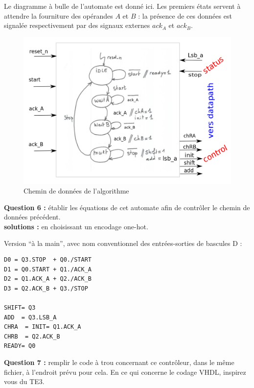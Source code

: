 \documentclass[a4paper,11pt]{article}
\begin{document}
Le diagramme à bulle de l'automate est donné ici. Les premiers états servent à attendre la fourniture des opérandes $A$ et $B$ : la présence de ces données est signalée respectivement par des signaux externes $ack_A$ et $ack_B$.

\begin{figure}[!h]
\begin{center}
\includegraphics[scale=0.3]{./figures/controleur_fsm.png}
\end{center}
\caption{Chemin de données de l'algorithme}
\end{figure}
\FloatBarrier

{\bf Question 6 :} établir les équations de cet automate afin de contrôler le chemin de données précédent.\\

{\bf solutions :} en choisissant un encodage one-hot.

Version ``à la main'', avec nom conventionnel des entrées-sorties de bascules D :

\begin{verbatim}
D0 = Q3.STOP  + Q0./START
D1 = Q0.START + Q1./ACK_A
D2 = Q1.ACK_A + Q2./ACK_B
D3 = Q2.ACK_B + Q3./STOP

SHIFT= Q3
ADD  = Q3.LSB_A
CHRA  = INIT= Q1.ACK_A
CHRB  = Q2.ACK_B
READY= Q0
\end{verbatim}

{\bf Question 7 :} remplir le code à trou concernant ce contrôleur, dans le même fichier, à l'endroit prévu pour cela. En ce qui concerne le codage VHDL, inspirez vous du TE3.\\
\end{document}
